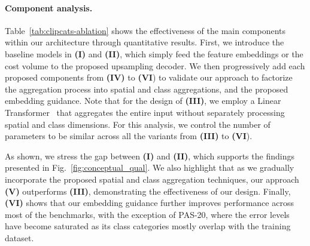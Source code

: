 \documentclass[10pt,twocolumn,letterpaper]{article}
\begin{document}
\paragraph{Component analysis.}
Table~\ref{tab:clipcats-ablation} shows the effectiveness of the main components within our architecture through quantitative results. 
First, we introduce the baseline models in \textbf{(I)} and \textbf{(II)}, which simply feed the feature embeddings or the cost volume to the proposed upsampling decoder. We then progressively add each proposed components from \textbf{(IV)} to \textbf{(VI}) to validate our approach to factorize the aggregation process into spatial and class aggregations, and the proposed embedding guidance. Note that for the design of \textbf{(III)}, we employ a Linear Transformer~\cite{katharopoulos2020transformers} that aggregates the entire input without separately processing spatial and class dimensions. For this analysis, we control the number of parameters to be similar across all the variants from \textbf{(III)} to \textbf{(VI}). 

As shown, we stress the gap between \textbf{(I)} and  \textbf{(II)}, which supports the findings presented in Fig.~\ref{fig:conceptual_qual}. 
We also highlight that as we gradually incorporate the proposed spatial and class aggregation techniques, our approach \textbf{(V)} outperforms \textbf{(III)}, demonstrating the effectiveness of our design.
Finally, \textbf{(VI)} shows that our embedding guidance further improves performance across most of the benchmarks, with the exception of PAS-20, where the error levels have become saturated as its class categories mostly overlap with the training dataset.
\end{document}
